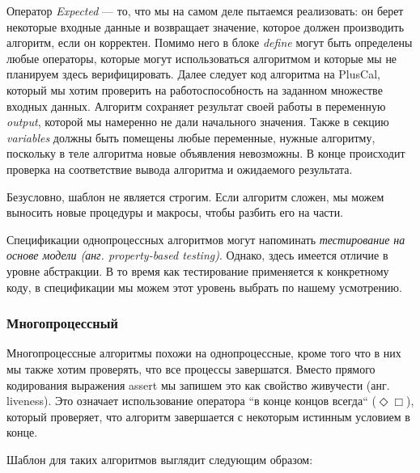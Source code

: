 \documentclass[14pt, openany]{book}
\begin{document}
Оператор \emph{Expected} --- то, что мы на самом деле пытаемся реализовать: он берет некоторые входные данные и возвращает значение, которое должен производить алгоритм, если он корректен. Помимо него в блоке \emph{define} могут быть определены любые операторы, которые могут использоваться алгоритмом и которые мы не планируем здесь верифицировать. Далее следует код алгоритма на PlusCal, который мы хотим проверить на работоспособность на заданном множестве входных данных. Алгоритм сохраняет результат своей работы в переменную \emph{output}, которой мы намеренно не дали начального значения. Также в секцию \emph{variables} должны быть помещены любые переменные, нужные алгоритму, поскольку в теле алгоритма новые объявления невозможны. В конце происходит проверка на соответствие вывода алгоритма и ожидаемого результата.

Безусловно, шаблон не является строгим. Если алгоритм сложен, мы можем выносить новые процедуры и макросы, чтобы разбить его на части.

Спецификации однопроцессных алгоритмов могут напоминать \emph{тестирование на основе модели (анг. property-based testing)}. Однако, здесь имеется отличие в уровне абстракции. В то время как тестирование применяется к конкретному коду, в спецификации мы можем этот уровень выбрать по нашему усмотрению.

\subsubsection{Многопроцессный}

Многопроцессные алгоритмы похожи на однопроцессные, кроме того что в них мы также хотим проверять, что все процессы завершатся. Вместо прямого кодирования выражения assert мы запишем это как свойство живучести (анг. liveness). Это означает использование оператора ``в конце концов всегда`` (\(\Diamond \Box\)), который проверяет, что алгоритм завершается с некоторым истинным условием в конце.

Шаблон для таких алгоритмов выглядит следующим образом:
\end{document}
